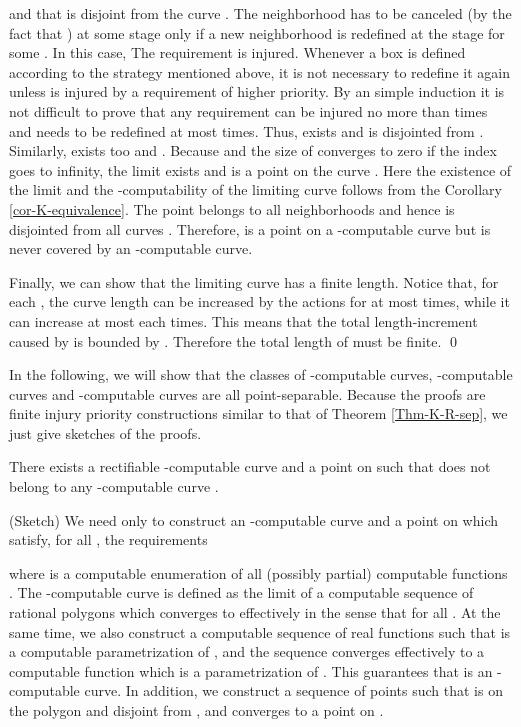 \documentclass{LMCS}
\theoremstyle{plain}
\begin{document}
and that  is disjoint from the curve . The neighborhood  has to be canceled (by the fact that ) at some stage only if a new neighborhood  is redefined at the stage  for some . In this case, The requirement  is injured.  Whenever a box  is defined according to the strategy mentioned above, it is not necessary to redefine it again unless  is injured by a requirement of higher priority. By an simple induction it is not difficult to prove that any requirement  can be injured no more than  times and  needs to be redefined at most  times. Thus,  exists and  is disjointed from . Similarly,  exists too and .  Because  and the size of  converges to zero if the index  goes to infinity, the limit  exists and  is a point on the curve . Here the existence of the limit and the -computability of the limiting curve  follows from the Corollary \ref{cor-K-equivalence}. The point  belongs to all neighborhoods  and hence is disjointed from all curves . Therefore,  is a point on a -computable curve but is never covered by an -computable curve.

Finally, we can show that the limiting curve  has a finite length. Notice that, for each , the curve length can be increased by the actions for  at most  times, while it can increase at most  each times. This means that the total length-increment caused by  is bounded by . Therefore the total length of  must be finite.
\qed

In the following, we will show that the classes of -computable curves, -computable curves and -computable curves are all point-separable. Because the proofs are finite injury priority constructions similar to that of Theorem \ref{Thm-K-R-sep}, we just give sketches of the proofs.

\begin{thm}\label{thm-R-M-sep}
There exists a rectifiable -computable curve  and a point  on  such that  does not belong to any -computable curve .
\end{thm}

\proof (Sketch) We need only to construct an -computable curve  and a point  on  which satisfy, for all , the requirements

where  is a computable enumeration of all (possibly partial) computable functions . The -computable curve  is defined as the limit of a computable sequence  of rational polygons which converges to  effectively in the sense that  for all . At the same time, we also construct a computable sequence  of real functions  such that  is a computable parametrization of , and the sequence  converges effectively to a computable function  which is a parametrization of . This guarantees that  is an -computable curve. In addition, we construct a sequence  of points such that  is on the polygon  and disjoint from , and  converges to a point  on .
\end{document}
